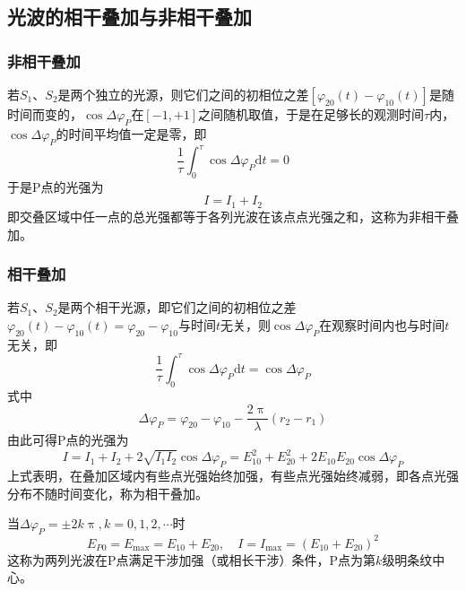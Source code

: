 \documentclass[12pt]{article}
\newcommand{\rmd}{\mathrm{d}}
\begin{document}
\subsection{光波的相干叠加与非相干叠加}

\subsubsection{非相干叠加}

若\(S_1\)、\(S_2\)是两个独立的光源，则它们之间的初相位之差\(\left[\varphi_{20} (t) - \varphi_{10} (t)\right]\)是随时间而变的，\(\cos \Delta \varphi_P\)在\(\left[-1, +1\right]\)之间随机取值，于是在足够长的观测时间\(\tau\)内，\(\cos \Delta \varphi_P\)的时间平均值一定是零，即
\begin{equation}
    \frac{1}{\tau} \int_{0}^{\tau} \cos \Delta \varphi_P \rmd t = 0
\end{equation}
于是P点的光强为
\begin{equation}
    I = I_1 + I_2
\end{equation}
即交叠区域中任一点的总光强都等于各列光波在该点点光强之和，这称为非相干叠加。

\subsubsection{相干叠加}

若\(S_1\)、\(S_2\)是两个相干光源，即它们之间的初相位之差\(\varphi_{20} (t) - \varphi_{10} (t) = \varphi_{20} - \varphi_{10}\)与时间\(t\)无关，则\(\cos \Delta \varphi_P\)在观察时间内也与时间\(t\)无关，即
\begin{equation}
    \frac{1}{\tau} \int_{0}^{\tau} \cos \Delta \varphi_P \rmd t = \cos \Delta \varphi_P
\end{equation}
式中
\begin{equation}
    \Delta \varphi_P = \varphi_{20} - \varphi_{10} - \frac{2 \uppi}{\lambda} (r_2 - r_1)
\end{equation}
由此可得P点的光强为
\begin{equation}
I=I_1+I_2+2 \sqrt{I_1 I_2} \cos \Delta \varphi_P=E_{10}^2+E_{20}^2+2 E_{10} E_{20} \cos \Delta \varphi_P
\end{equation}
上式表明，在叠加区域内有些点光强始终加强，有些点光强始终减弱，即各点光强分布不随时间变化，称为相干叠加。

当\(\Delta \varphi_P = \pm 2k \uppi, k=0,1,2,\cdots\)时
\begin{equation}
E_{P 0}=E_{\max }=E_{10}+E_{20}, \quad I=I_{\max }=\left(E_{10}+E_{20}\right)^2
\end{equation}
这称为两列光波在P点满足干涉加强（或相长干涉）条件，P点为第\(k\)级明条纹中心。
\end{document}
